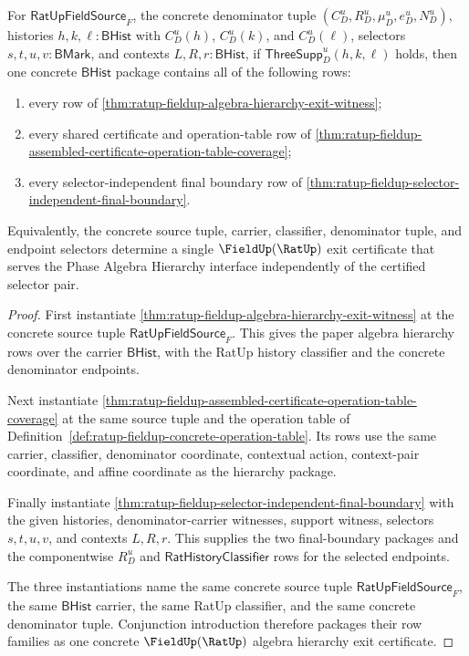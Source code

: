 \begin{theorem}
\label{thm:ratup-fieldup-algebra-hierarchy-selector-independent-exit}
For $\mathsf{RatUpFieldSource}_F$, the concrete denominator tuple
$(C_D^u,R_D^u,\mu_D^u,e_D^u,N_D^u)$, histories
$h,k,\ell:\mathsf{BHist}$ with $C_D^u(h)$, $C_D^u(k)$, and $C_D^u(\ell)$,
selectors $s,t,u,v:\mathsf{BMark}$, and contexts
$L,R,r:\mathsf{BHist}$, if $\mathsf{ThreeSupp}_D^u(h,k,\ell)$ holds, then one
concrete $\mathsf{BHist}$ package contains all of the following rows:
\begin{enumerate}
  \item every row of
  \autoref{thm:ratup-fieldup-algebra-hierarchy-exit-witness};
  \item every shared certificate and operation-table row of
  \autoref{thm:ratup-fieldup-assembled-certificate-operation-table-coverage};
  \item every selector-independent final boundary row of
  \autoref{thm:ratup-fieldup-selector-independent-final-boundary}.
\end{enumerate}
Equivalently, the concrete source tuple, carrier, classifier, denominator
tuple, and endpoint selectors determine a single
$\FieldUp(\RatUp)$ exit certificate that serves the Phase Algebra Hierarchy
interface independently of the certified selector pair.
\end{theorem}
\begin{proof}
First instantiate
\autoref{thm:ratup-fieldup-algebra-hierarchy-exit-witness} at the concrete
source tuple $\mathsf{RatUpFieldSource}_F$. This gives the paper algebra
hierarchy rows over the carrier $\mathsf{BHist}$, with the RatUp history
classifier and the concrete denominator endpoints.

Next instantiate
\autoref{thm:ratup-fieldup-assembled-certificate-operation-table-coverage} at
the same source tuple and the operation table of
Definition~\ref{def:ratup-fieldup-concrete-operation-table}. Its rows use the
same carrier, classifier, denominator coordinate, contextual action,
context-pair coordinate, and affine coordinate as the hierarchy package.

Finally instantiate
\autoref{thm:ratup-fieldup-selector-independent-final-boundary} with the given
histories, denominator-carrier witnesses, support witness, selectors
$s,t,u,v$, and contexts $L,R,r$. This supplies the two final-boundary packages
and the componentwise $R_D^u$ and $\mathsf{RatHistoryClassifier}$ rows for the
selected endpoints.

The three instantiations name the same concrete source tuple
$\mathsf{RatUpFieldSource}_F$, the same $\mathsf{BHist}$ carrier, the same RatUp
classifier, and the same concrete denominator tuple. Conjunction introduction
therefore packages their row families as one concrete
$\FieldUp(\RatUp)$ algebra hierarchy exit certificate.
\end{proof}

